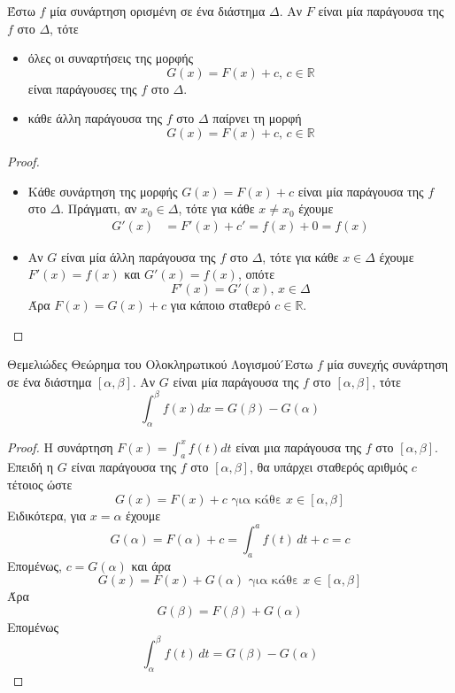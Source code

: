 \documentclass[a4paper, 12pt]{article}
\begin{document}
\begin{theorem}{}
  Έστω $f$ μία συνάρτηση ορισμένη σε ένα διάστημα $Δ$. Αν $F$ είναι μία παράγουσα της $f$ στο $Δ$, τότε
  \begin{itemize}
    \item όλες οι συναρτήσεις της μορφής
          $$G(x)=F(x)+c \text{, } c\in\mathbb{R}$$
          είναι παράγουσες της $f$ στο $Δ$.
    \item κάθε άλλη παράγουσα της $f$ στο $Δ$ παίρνει τη μορφή
          $$G(x)=F(x)+c \text{, } c\in\mathbb{R}$$
  \end{itemize}
\end{theorem}
\begin{proof}
  \begin{itemize}
    \item Κάθε συνάρτηση της μορφής $G(x)=F(x)+c$ είναι μία παράγουσα της $f$ στο $Δ$.
          Πράγματι, αν $x_0\in Δ$, τότε για κάθε $x\ne x_0$ έχουμε
          \begin{align*}
            G'(x) & =F'(x)+c'=f(x)+0 =f(x)
          \end{align*}

    \item Αν $G$ είναι μία άλλη παράγουσα της $f$ στο $Δ$, τότε για κάθε $x\in Δ$ έχουμε $F'(x)=f(x)$ και $G'(x)=f(x)$, οπότε
          $$F'(x)=G'(x) \text{, } x\in Δ$$
          Άρα $F(x)=G(x)+c$ για κάποιο σταθερό $c\in\mathbb{R}$.
  \end{itemize}
\end{proof}

\begin{theorem}{Θεμελιώδες Θεώρημα του Ολοκληρωτικού Λογισμού}
  ́Εστω $f$ μία συνεχής συνάρτηση σε ένα διάστημα $[α, β]$. Αν $G$ είναι
  μία παράγουσα της $f$ στο $[α, β]$, τότε
  $$\int_{α}^{β} f(x)dx=G(β)-G(α)$$
\end{theorem}
\begin{proof}
  Η συνάρτηση $F(x)=\int_{a}^{x} f(t)dt$ είναι μια παράγουσα της $f$ στο $[α, β]$. Επειδή η $G$ είναι παράγουσα της $f$ στο $[α, β]$, θα υπάρχει σταθερός αριθμός $c$ τέτοιος ώστε
  $$G(x)=F(x)+c \text{ για κάθε } x\in [α, β]$$
  Ειδικότερα, για $x=α$ έχουμε
  $$G(α)=F(α)+c=\int_{a}^{a}f(t)\,dt+c=c$$
  Επομένως, $c=G(α)$ και άρα
  $$G(x)=F(x)+G(α) \text{ για κάθε } x\in [α, β]$$
  Άρα
  $$G(β)=F(β)+G(α)$$
  Επομένως
  $$\int_{α}^{β} f(t)\,dt=G(β)-G(α)$$
\end{proof}
\end{document}

